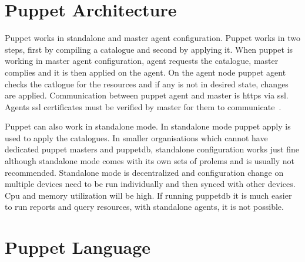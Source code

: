 \section{Puppet Architecture}
Puppet works in standalone and master agent configuration. Puppet works in two
steps, first by compiling a catalogue and second by applying it. When puppet is
working in master agent configuration, agent requests the catalogue, master
complies and it is then applied on the agent. On the agent node puppet agent
checks the catlogue for the resources and if any is not in desired state,
changes are applied. Communication between puppet agent and master is https via
ssl. Agents ssl certificates must be verified by master for them to
communicate~\cite{hid-sp18-413-puppet-architecture}. \par
Puppet can also work in standalone mode. In standalone mode puppet apply is used
to apply the catalogues. In smaller organisations which cannot have dedicated
puppet masters and puppetdb, standalone configuration works just fine although
standalone mode comes with its own sets of prolems and is usually not
recommended. Standalone mode is decentralized and configuration change on
multiple devices need to be run individually and then synced with other
devices. Cpu and memory utilization will be high. If running puppetdb it is much
easier to run reports and query resources, with standalone agents, it is not
possible.

\section{Puppet Language}


